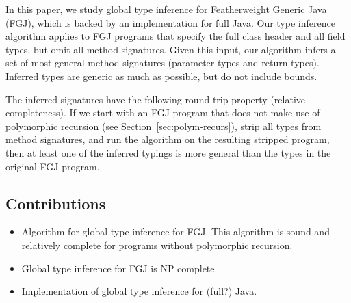 In this paper, we study global type inference for Featherweight
Generic Java \cite{DBLP:journals/toplas/IgarashiPW01} (FGJ), which is backed
by an implementation for full Java. Our type inference algorithm
applies to FGJ programs that specify the full class header and all field types,
but omit all method signatures. 
Given this input, our algorithm
infers a set of most general method signatures (parameter types and return types).
Inferred types are generic as much as possible, but do not include
bounds.

The inferred signatures have the following round-trip property
(relative completeness). If we
start with an FGJ program that does not make use of polymorphic
recursion (see Section~\ref{sec:polym-recurs}), strip all types from
method signatures, and run the algorithm on the 
resulting stripped program, then at least one of the inferred typings is more
general than the types in the original FGJ program.






\subsection{Contributions}
\label{sec:contributions}

\begin{itemize}
\item Algorithm for global type inference for FGJ. This algorithm is
  sound and relatively complete for programs without polymorphic recursion.
\item Global type inference for FGJ is NP complete.
\item Implementation of global type inference for (full?) Java.
\end{itemize}


